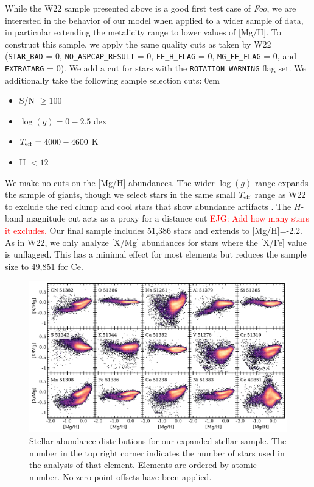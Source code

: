 \documentclass[modern]{aastex631}
\newcommand{\logg}{\log(g)}
\newcommand{\teff}{T_{\rm eff}}
\newcommand{\ejg}[1]{\textcolor{red}{EJG: #1}}
\newcommand{\name}{\textsl{Foo}} %
\begin{document}
While the W22 sample presented above is a good first test case of \name, we are interested in the behavior of our model when applied to a wider sample of data, in particular extending the metalicity range to lower values of [Mg/H]. To construct this sample, we apply the same quality cuts as taken by W22 (\texttt{STAR\_BAD} = 0, \texttt{NO\_ASPCAP\_RESULT} = 0, \texttt{FE\_H\_FLAG} = 0, \texttt{MG\_FE\_FLAG} = 0, and \texttt{EXTRATARG} = 0). We add a cut for stars with the \texttt{ROTATION\_WARNING} flag set. We additionally take the following sample selection cuts: 
\itemsep0em
\begin{itemize}
    \item S/N $\geq 100$
    \item $\logg =  0 - 2.5$ dex
    \item $\teff = 4000-4600$ K
    \item H $< 12$
\end{itemize}
We make no cuts on the [Mg/H] abundances. The wider $\logg$ range expands the sample of giants, though we select stars in the same small $\teff$ range as W22 to exclude the red clump \citep{vincenzo2021a} and cool stars that show abundance artifacts \citep{jonsson2020}. The $H$-band magnitude cut acts as a proxy for a distance cut \ejg{Add how many stars it excludes.}
Our final sample includes 51,386 stars and extends to [Mg/H]=-2.2. As in W22, we only analyze [X/Mg] abundances for stars where the [X/Fe] value is unflagged. This has a minimal effect for most elements but reduces the sample size to 49,851 for Ce. 

\begin{figure}[htb!]
    \centering
    \includegraphics[width=\textwidth]{Figures/xmg.pdf}
    \caption{Stellar abundance distributions for our expanded stellar sample. The number in the top right corner indicates the number of stars used in the analysis of that element. Elements are ordered by atomic number. No zero-point offsets have been applied.}
    \label{fig:exp_xmg}
\end{figure}
\end{document}
